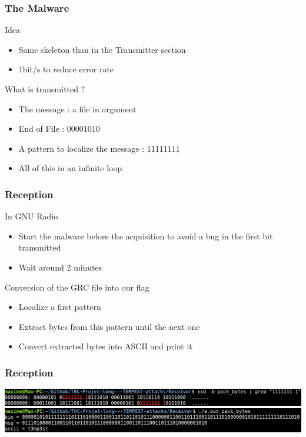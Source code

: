 \begin{frame}
\frametitle{The Malware}
\begin{block}{Idea}
\begin{itemize}
\item Same skeleton than in the Transmitter section
\item 1bit/s to reduce error rate
\end{itemize}
\end{block}
\begin{block}{What is transmitted ?}
\begin{itemize}
\item The message : a file in argument
\item End of File : 00001010
\item A pattern to localize the message : 11111111
\item All of this in an infinite loop
\end{itemize}
\end{block}
\end{frame}

\begin{frame}
\frametitle{Reception}
\begin{block}{In GNU Radio}
\begin{itemize}
\item Start the malware before the acquisition to avoid a bug in the first bit transmitted
\item Wait around 2 minutes
\end{itemize}
\end{block}
\begin{block}{Conversion of the GRC file into our flag}
\begin{itemize}
\item Localize a first pattern
\item Extract bytes from this pattern until the next one
\item Convert extracted bytes into ASCII and print it
\end{itemize}
\end{block}
\end{frame}

\begin{frame}
\frametitle{Reception}
\centering \includegraphics[scale=0.22]{images/xxd1.png}\\
\null
\centering \includegraphics[scale=0.22]{images/xxd2.png}
\end{frame}

